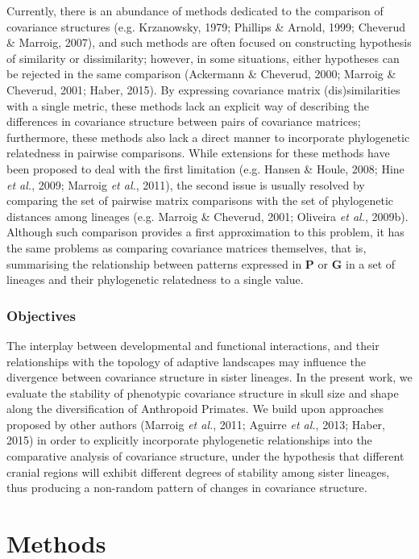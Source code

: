 \documentclass[12pt,twoside]{report}
\begin{document}
Currently, there is an abundance of methods dedicated to the comparison
of covariance structures (e.g. Krzanowsky, 1979; Phillips \& Arnold,
1999; Cheverud \& Marroig, 2007), and such methods are often focused on
constructing hypothesis of similarity or dissimilarity; however, in some
situations, either hypotheses can be rejected in the same comparison
(Ackermann \& Cheverud, 2000; Marroig \& Cheverud, 2001; Haber, 2015).
By expressing covariance matrix (dis)similarities with a single metric,
these methods lack an explicit way of describing the differences in
covariance structure between pairs of covariance matrices; furthermore,
these methods also lack a direct manner to incorporate phylogenetic
relatedness in pairwise comparisons. While extensions for these methods
have been proposed to deal with the first limitation (e.g. Hansen \&
Houle, 2008; Hine \emph{et al.}, 2009; Marroig \emph{et al.}, 2011), the
second issue is usually resolved by comparing the set of pairwise matrix
comparisons with the set of phylogenetic distances among lineages (e.g.
Marroig \& Cheverud, 2001; Oliveira \emph{et al.}, 2009b). Although such
comparison provides a first approximation to this problem, it has the
same problems as comparing covariance matrices themselves, that is,
summarising the relationship between patterns expressed in $\mathbf{P}$
or $\mathbf{G}$ in a set of lineages and their phylogenetic relatedness
to a single value.

\subsubsection{Objectives}\label{objectives-1}

The interplay between developmental and functional interactions, and
their relationships with the topology of adaptive landscapes may
influence the divergence between covariance structure in sister
lineages. In the present work, we evaluate the stability of phenotypic
covariance structure in skull size and shape along the diversification
of Anthropoid Primates. We build upon approaches proposed by other
authors (Marroig \emph{et al.}, 2011; Aguirre \emph{et al.}, 2013;
Haber, 2015) in order to explicitly incorporate phylogenetic
relationships into the comparative analysis of covariance structure,
under the hypothesis that different cranial regions will exhibit
different degrees of stability among sister lineages, thus producing a
non-random pattern of changes in covariance structure.

\section{Methods}\label{methods-2}
\end{document}
